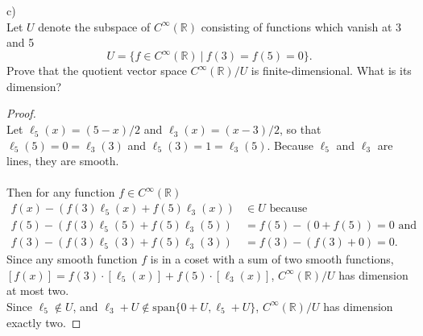 \documentclass{article}
\newenvironment{problem}[2][Problem]{\begin{trivlist}
\item[\hskip \labelsep {\bfseries #1}\hskip \labelsep {\bfseries #2.}]}{\end{trivlist}}
\begin{document}
\begin{problem}{1} (c) \\
  Let $U$ denote the subspace of $C^\infty(\mathbb{R})$ consisting of functions
  which vanish at 3 and 5 \[
    U = \{ f \in C^\infty(\mathbb{R})\ |\ f(3) = f(5) = 0 \}.
  \] Prove that the quotient vector space $C^\infty(\mathbb{R})/U$ is
  finite-dimensional. What is its dimension?
\end{problem}
\begin{proof} \text{} \\
  Let $\ell_5(x) = (5-x)/2$ and $\ell_3(x) = (x-3)/2$, so that
  $\ell_5(5) = 0 = \ell_3(3)$ and $\ell_5(3) = 1 = \ell_3(5)$. Because
  $\ell_5$ and $\ell_3$ are lines, they are smooth.\\ \\
%
  Then for any function $f \in C^\infty(\mathbb{R})$ \begin{align*}
    f(x) - (f(3)\ell_5(x) + f(5)\ell_3(x)) &\in U \text{ because}\\
    f(5) - (f(3)\ell_5(5) + f(5)\ell_3(5)) &= f(5) - (0 + f(5)) = 0 \text{ and}\\
    f(3) - (f(3)\ell_5(3) + f(5)\ell_3(3)) &= f(3) - (f(3) + 0) = 0.
  \end{align*}
  Since any smooth function $f$ is in a coset with a sum of two smooth functions,
  $[f(x)] = f(3)\cdot[\ell_5(x)] + f(5)\cdot[\ell_3(x)]$,
  $C^\infty(\mathbb{R})/U$ has dimension at most two.\\
  Since $\ell_5 \not\in U$, and $\ell_3 + U \not\in \text{span} \{ 0 + U, \ell_5 + U \}$,
  $C^\infty(\mathbb{R})/U$ has dimension exactly two.
\end{proof}
\end{document}
